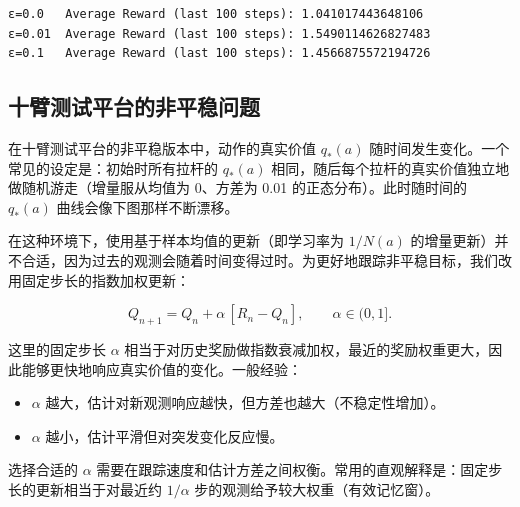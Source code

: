 \documentclass[11pt]{ctexart}
\providecommand{\tightlist}{%
      \setlength{\itemsep}{0pt}\setlength{\parskip}{0pt}}
\begin{document}
    \begin{Verbatim}[commandchars=\\\{\}]
ε=0.0   Average Reward (last 100 steps): 1.041017443648106
ε=0.01  Average Reward (last 100 steps): 1.5490114626827483
ε=0.1   Average Reward (last 100 steps): 1.4566875572194726
    \end{Verbatim}

    \hypertarget{ux5341ux81c2ux6d4bux8bd5ux5e73ux53f0ux7684ux975eux5e73ux7a33ux95eeux9898}{%
\subsection{十臂测试平台的非平稳问题}\label{ux5341ux81c2ux6d4bux8bd5ux5e73ux53f0ux7684ux975eux5e73ux7a33ux95eeux9898}}

在十臂测试平台的非平稳版本中，动作的真实价值 \(q_*(a)\)
随时间发生变化。一个常见的设定是：初始时所有拉杆的 \(q_*(a)\)
相同，随后每个拉杆的真实价值独立地做随机游走（增量服从均值为 0、方差为
0.01 的正态分布）。此时随时间的 \(q_*(a)\) 曲线会像下图那样不断漂移。

在这种环境下，使用基于样本均值的更新（即学习率为 \(1/N(a)\)
的增量更新）并不合适，因为过去的观测会随着时间变得过时。为更好地跟踪非平稳目标，我们改用固定步长的指数加权更新：

\[
Q_{n+1} = Q_n + \alpha\,[R_n - Q_n], \qquad \alpha \in (0,1].
\]

这里的固定步长 \(\alpha\)
相当于对历史奖励做指数衰减加权，最近的奖励权重更大，因此能够更快地响应真实价值的变化。一般经验：

\begin{itemize}
\tightlist
\item
  \(\alpha\) 越大，估计对新观测响应越快，但方差也越大（不稳定性增加）。
\item
  \(\alpha\) 越小，估计平滑但对突发变化反应慢。
\end{itemize}

选择合适的 \(\alpha\)
需要在跟踪速度和估计方差之间权衡。常用的直观解释是：固定步长的更新相当于对最近约
\(1/\alpha\) 步的观测给予较大权重（有效记忆窗）。
\end{document}
